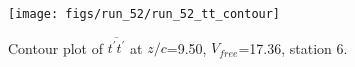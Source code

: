 \begin{figure}[H]
\centering
\texttt{[image: figs/run\_52/run\_52\_tt\_contour]}
\caption{Contour plot of $\overline{t^\prime t^\prime}$ at $z/c$=9.50, $V_{free}$=17.36, station 6.}
\end{figure}


